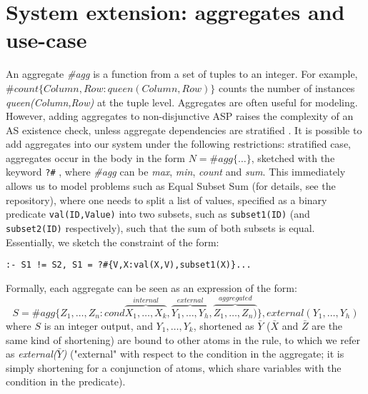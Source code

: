 
\section{System extension: aggregates and use-case}\label{section:aggregates}
An aggregate \textit{\#agg} is a function from a set of tuples to an integer. For example,\\$\#\textit{count}\{ Column,Row: \textit{queen}(Column,Row) \}$ counts the number of instances\\\textit{queen(Column,Row)} at the tuple level. Aggregates are often useful for modeling. 
However, adding aggregates to non-disjunctive ASP raises the complexity of an AS existence check, unless aggregate dependencies are stratified \parencite{aggregates_complexity}. It is possible to add aggregates into our system under the following restrictions: stratified case, aggregates occur in the body in the form ${N = \#\textit{agg}\{ \dots \}}$, sketched with the keyword \verb|?#| , where \textit{\#agg} can be \textit{max}, \textit{min}, \textit{count} and \textit{sum}. This immediately allows us  to model problems such as Equal Subset Sum (for details, see the repository), where one needs to split a list of values, specified as a binary predicate   \verb|val(ID,Value)| into two subsets, such as \verb|subset1(ID)| (and \verb|subset2(ID)| respectively), such that the sum of both subsets is equal. Essentially, we sketch the constraint of the form: 

\verb|:- S1 != S2, S1 = ?#{V,X:val(X,V),subset1(X)}...|

Formally, each aggregate can be seen as an expression of the form:
\begin{equation*}
	S = \#\textit{agg}\{ Z_1,\dots,Z_n: \textit{cond}\overbrace{X_1,\dots,X_k}^{\textit{internal}}, \overbrace{Y_1,\dots,Y_h}^{\textit{external}},\overbrace{Z_1,\dots,Z_n)}^{\textit{aggregated}} \}, \textit{external}(Y_1,\dots,Y_h)
\end{equation*}
	where $S$ is an integer output, and $Y_1,\dots,Y_k$, shortened as $\bar Y$ ($\bar X$ and $\bar Z$ are the same kind of shortening) are bound to other atoms in the rule, to which we refer as \textit{external($\bar Y$)} ("external" with respect to the condition in the aggregate; it is simply shortening for a conjunction of atoms, which share variables with the condition in the predicate). 

